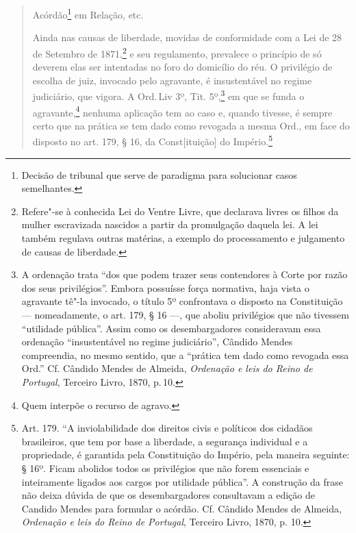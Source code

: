\begin{quote}
Acórdão\footnote{Decisão de tribunal que serve de paradigma para
  solucionar casos semelhantes.} em Relação, etc.


Ainda nas causas de liberdade, movidas de conformidade com a Lei de 28
de Setembro de 1871,\footnote{Refere"-se à conhecida Lei do Ventre
  Livre, que declarava livres os filhos da mulher escravizada nascidos a
  partir da promulgação daquela lei. A lei também regulava outras
  matérias, a exemplo do processamento e julgamento de causas de
  liberdade.} e seu regulamento, prevalece o princípio de só deverem
elas ser intentadas no foro do domicílio do réu. O privilégio de escolha
de juiz, invocado pelo agravante, é insustentável no regime judiciário,
que vigora. A Ord.\,Liv 3º, Tit. 5º,\footnote{A ordenação trata ``dos
  que podem trazer seus contendores à Corte por razão dos seus
  privilégios''. Embora possuísse força normativa, haja vista o agravante
  tê"-la invocado, o título 5º confrontava o disposto na Constituição ---
  nomeadamente, o art. 179, § 16 ---, que aboliu privilégios que não
  tivessem ``utilidade pública''. Assim como os desembargadores
  consideravam essa ordenação ``insustentável no regime judiciário'',
  Cândido Mendes compreendia, no mesmo sentido, que a ``prática tem dado
  como revogada essa Ord.'' Cf. Cândido Mendes de Almeida,
\emph{Ordenação e leis do Reino de Portugal}, Terceiro Livro, 1870, p.\,10.} em
que se funda o agravante,\footnote{Quem interpõe o recurso de agravo.}
nenhuma aplicação tem ao caso e, quando tivesse, é sempre certo que na
prática se tem dado como revogada a mesma Ord., em face do disposto no
art. 179, § 16, da Const{[}ituição{]} do Império.\footnote{Art. 179. ``A
  inviolabilidade dos direitos civis e políticos dos cidadãos
  brasileiros, que tem por base a liberdade, a segurança individual e a
  propriedade, é garantida pela Constituição do Império, pela maneira
  seguinte: § 16º. Ficam abolidos todos os privilégios que não forem
  essenciais e inteiramente ligados aos cargos por utilidade pública''. A
  construção da frase não deixa dúvida de que os desembargadores
  consultavam a edição de Candido Mendes para formular o acórdão. Cf. Cândido Mendes de Almeida,
  \emph{Ordenação e leis do Reino de Portugal}, Terceiro Livro, 1870, p. 10.}


\end{quote}
